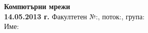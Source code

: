 \documentclass[11pt]{exam}
\begin{document}
\pagestyle{headandfoot}
\firstpageheader
  {\large\bfseries Компютърни мрежи\\14.05.2013 г.}
  {}
  {Факултетен №:\enspace\makebox[2cm]{\dotfill},
    поток:\enspace\makebox[1cm]{\dotfill},
    група:\enspace\makebox[1cm]{\dotfill}\\
    Име:\enspace\makebox[8.8cm]{\dotfill}}

\firstpagefooter{}{}{}
\footer{}{}{}



\end{document}
